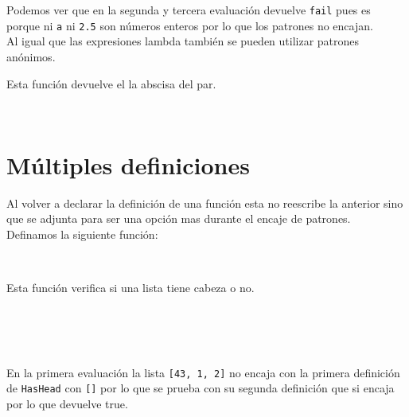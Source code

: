       Podemos ver que en la segunda y tercera evaluación devuelve \texttt{fail} pues es porque ni \texttt{\textquotesingle a\textquotesingle} ni \texttt{2.5} son números enteros por lo que los patrones no encajan.
      \\
      
      Al igual que las expresiones lambda también se pueden utilizar patrones anónimos.
      
      \begin{fxcode}
      \end{fxcode}
      
      Esta función devuelve el la abscisa del par.
      
      \begin{fxcode}
         \\
      \end{fxcode}
      
   \section{Múltiples definiciones}
      Al volver a declarar la definición de una función esta no reescribe la anterior sino que se adjunta para ser una opción mas durante el encaje de patrones.
      \\
      
      Definamos la siguiente función:
      
      \begin{fxcode}
         \\
      \end{fxcode}
      
      Esta función verifica si una lista tiene cabeza o no.
      
      \begin{fxcode}
         \\
         \\
         \\
      \end{fxcode}
      
      En la primera evaluación la lista \texttt{[43, 1, 2]} no encaja con la primera definición de \texttt{HasHead} con \texttt{[]} por lo que se prueba con su segunda definición que si encaja por lo que devuelve true.
      \\
      
